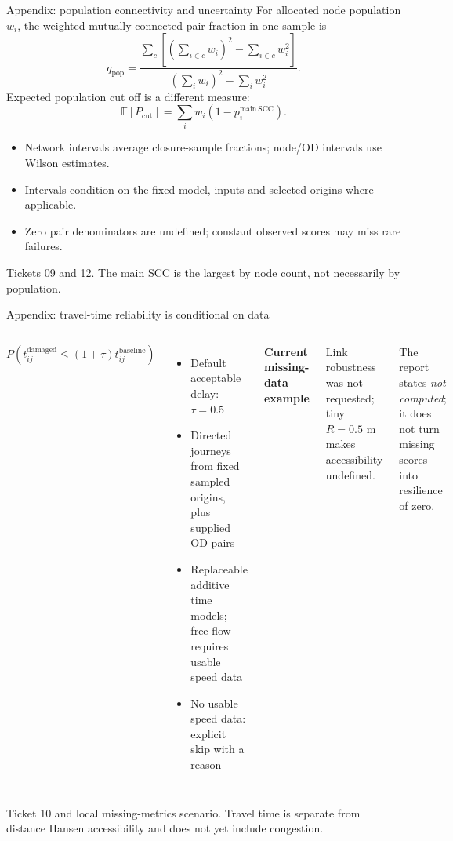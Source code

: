 \documentclass[11pt,aspectratio=169]{beamer}
\newcommand{\src}[1]{\vfill{\fontsize{7.5}{9}\selectfont\color{Muted}#1\par}}
\newcommand{\smallitems}{\setlength{\itemsep}{1.5mm}}
\begin{document}
\begin{frame}{Appendix: population connectivity and uncertainty}
\small
For allocated node population $w_i$, the weighted mutually connected pair fraction in one sample is
\[
q_{\mathrm{pop}}=
\frac{\sum_c\left[(\sum_{i\in c}w_i)^2-\sum_{i\in c}w_i^2\right]}
{(\sum_iw_i)^2-\sum_iw_i^2}.
\]
Expected population cut off is a different measure:
\[
\mathbb E[P_{\mathrm{cut}}]=\sum_i w_i(1-p_i^{\mathrm{main\ SCC}}).
\]
\begin{itemize}\setlength{\itemsep}{2mm}
\item Network intervals average closure-sample fractions; node/OD intervals use Wilson estimates.
\item Intervals condition on the fixed model, inputs and selected origins where applicable.
\item Zero pair denominators are undefined; constant observed scores may miss rare failures.
\end{itemize}
\src{Tickets 09 and 12. The main SCC is the largest by node count, not necessarily by population.}
\end{frame}

\begin{frame}{Appendix: travel-time reliability is conditional on data}
\begin{columns}[T,totalwidth=\textwidth]
\small
\[
P\!\left(t_{ij}^{\mathrm{damaged}}\le(1+\tau)t_{ij}^{\mathrm{baseline}}\right)
\]
\begin{itemize}\smallitems
\item Default acceptable delay: $\tau=0.5$
\item Directed journeys from fixed sampled origins, plus supplied OD pairs
\item Replaceable additive time models; free-flow requires usable speed data
\item No usable speed data: explicit skip with a reason
\end{itemize}
\textbf{Current missing-data example}
\par\vspace{3mm}
\small Link robustness was not requested; tiny $R=0.5$ m makes accessibility undefined.
\par\vspace{3mm}
The report states \emph{not computed}; it does not turn missing scores into resilience of zero.
\end{columns}
\src{Ticket 10 and local missing-metrics scenario. Travel time is separate from distance Hansen accessibility and does not yet include congestion.}
\end{frame}
\end{document}
